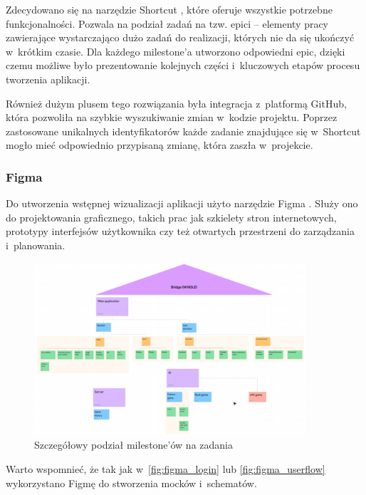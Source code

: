 Zdecydowano się na narzędzie Shortcut \cite{Shortcut}, które oferuje
wszystkie potrzebne funkcjonalności. Pozwala na podział zadań na tzw.
epici -- elementy pracy zawierające wystarczająco dużo zadań do realizacji,
których nie da się ukończyć w~krótkim czasie. Dla każdego milestone'a
utworzono odpowiedni epic, dzięki czemu możliwe było prezentowanie
kolejnych części i~kluczowych etapów procesu tworzenia aplikacji.

\FloatBarrier

Również dużym plusem tego rozwiązania była integracja
z~platformą GitHub\cite{Github}, która pozwoliła na
szybkie wyszukiwanie zmian w~kodzie projektu. Poprzez
zastosowane unikalnych identyfikatorów każde zadanie
znajdujące się w~Shortcut mogło mieć odpowiednio przypisaną
zmianę, która zaszła w~projekcie.


\subsubsection{Figma}

Do utworzenia wstępnej wizualizacji aplikacji użyto narzędzie Figma \cite{Figma}.
Służy ono do projektowania graficznego, takich prac jak szkielety stron
internetowych, prototypy interfejsów użytkownika czy też otwartych przestrzeni
do zarządzania i~planowania.

\begin{figure}[h!]
    \centering
    \includegraphics[width=0.9\textwidth]{img/schematy/milestones.png}
    \caption{Szczegółowy podział milestone'ów na zadania}
\end{figure}

Warto wspomnieć, że tak jak w~\ref{fig:figma_login} lub
\ref{fig:figma_userflow} wykorzystano Figmę do stworzenia mocków i~schematów.

\FloatBarrier

